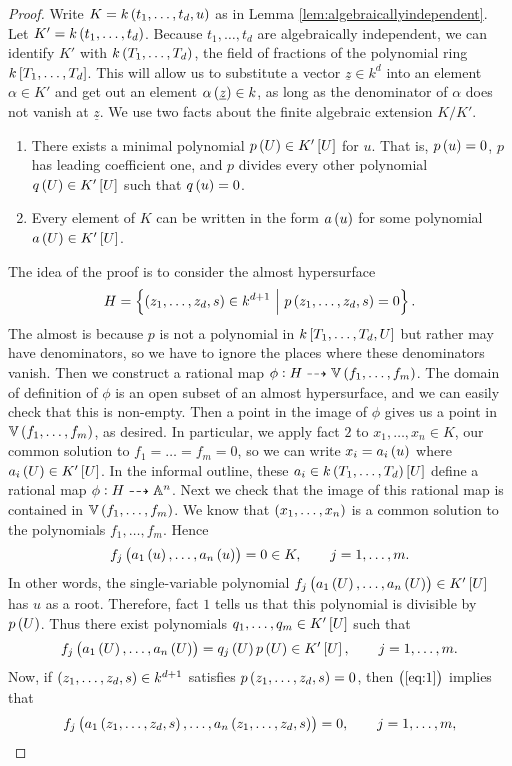\begin{proof}
Write $ K = k\br{t_1, \dots, t_d, u} $ as in Lemma \ref{lem:algebraicallyindependent}. Let $ K' = k\br{t_1, \dots, t_d} $. Because $ t_1, \dots, t_d $ are algebraically independent, we can identify $ K' $ with $ k\br{T_1, \dots, T_d} $, the field of fractions of the polynomial ring $ k\sbr{T_1, \dots, T_d} $. This will allow us to substitute a vector $ \underline{z} \in k^d $ into an element $ \alpha \in K' $ and get out an element $ \alpha\br{\underline{z}} \in k $, as long as the denominator of $ \alpha $ does not vanish at $ \underline{z} $. We use two facts about the finite algebraic extension $ K / K' $.
\begin{enumerate}[label=Fact \arabic*., leftmargin=0.5in]
\item There exists a minimal polynomial $ p\br{U} \in K'\sbr{U} $ for $ u $. That is, $ p\br{u} = 0 $, $ p $ has leading coefficient one, and $ p $ divides every other polynomial $ q\br{U} \in K'\sbr{U} $ such that $ q\br{u} = 0 $.
\item Every element of $ K $ can be written in the form $ a\br{u} $ for some polynomial $ a\br{U} \in K'\sbr{U} $.
\end{enumerate}
The idea of the proof is to consider the almost hypersurface
$$ H = \cbr{\br{z_1, \dots, z_d, s} \in k^{d + 1} \st p\br{z_1, \dots, z_d, s} = 0}. $$
The almost is because $ p $ is not a polynomial in $ k\sbr{T_1, \dots, T_d, U} $ but rather may have denominators, so we have to ignore the places where these denominators vanish. Then we construct a rational map $ \phi : H \dashrightarrow \VV\br{f_1, \dots, f_m} $. The domain of definition of $ \phi $ is an open subset of an almost hypersurface, and we can easily check that this is non-empty. Then a point in the image of $ \phi $ gives us a point in $ \VV\br{f_1, \dots, f_m} $, as desired. In particular, we apply fact $ 2 $ to $ x_1, \dots, x_n \in K $, our common solution to $ f_1 = \dots = f_m = 0 $, so we can write $ x_i = a_i\br{u} $ where $ a_i\br{U} \in K'\sbr{U} $. In the informal outline, these $ a_i \in k\br{T_1, \dots, T_d}\sbr{U} $ define a rational map $ \phi : H \dashrightarrow \AA^n $. Next we check that the image of this rational map is contained in $ \VV\br{f_1, \dots, f_m} $. We know that $ \br{x_1, \dots, x_n} $ is a common solution to the polynomials $ f_1, \dots, f_m $. Hence
$$ f_j\br{a_1\br{u}, \dots, a_n\br{u}} = 0 \in K, \qquad j = 1, \dots, m. $$
In other words, the single-variable polynomial $ f_j\br{a_1\br{U}, \dots, a_n\br{U}} \in K'\sbr{U} $ has $ u $ as a root. Therefore, fact $ 1 $ tells us that this polynomial is divisible by $ p\br{U} $. Thus there exist polynomials $ q_1, \dots, q_m \in K'\sbr{U} $ such that
\begin{equation}
\label{eq:1}
f_j\br{a_1\br{U}, \dots, a_n\br{U}} = q_j\br{U}p\br{U} \in K'\sbr{U}, \qquad j = 1, \dots, m.
\end{equation}
Now, if $ \br{z_1, \dots, z_d, s} \in k^{d + 1} $ satisfies $ p\br{z_1, \dots, z_d, s} = 0 $, then $ \br{\ref{eq:1}} $ implies that
$$ f_j\br{a_1\br{z_1, \dots, z_d, s}, \dots, a_n\br{z_1, \dots, z_d, s}} = 0, \qquad j = 1, \dots, m, $$


\end{proof}
